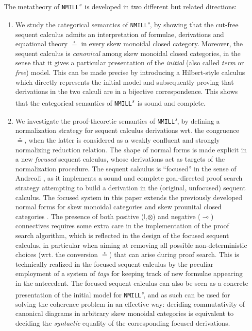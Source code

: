 \documentclass[submission,copyright,creativecommons]{eptcs}
\theoremstyle{definition}
\newcommand{\ot}{\otimes}
\newcommand{\lolli}{\multimap}
\newcommand{\I}{\mathsf{I}}
\newcommand{\NMILL}{\texttt{NMILL}}
\newcommand{\SkNMILL}{\NMILL\textsuperscript{\textit{s}}}
\begin{document}
The metatheory of \SkNMILL\ is developed in two different but related directions:
\begin{enumerate}[($i$)]
  \item We study the categorical semantics of \SkNMILL, by showing that the cut-free sequent calculus admits an interpretation of formulae, derivations and equational theory $\circeq$ in every skew monoidal closed category. Moreover, the sequent calculus is \emph{canonical} among skew monoidal closed categories, in the sense that it gives a particular presentation of the \emph{initial} (also called \emph{term} or \emph{free}) model. This can be made precise by introducing a Hilbert-style calculus which directly represents the initial model and subsequently proving that derivations in the two calculi are in a bijective correspondence.
This shows that the categorical semantics of \SkNMILL\ is sound and
complete.

\item We investigate the proof-theoretic semantics of \SkNMILL, by defining a normalization strategy for sequent calculus derivations wrt. the congruence $\circeq$, when the latter is considered as a weakly confluent and strongly normalizing reduction relation. The shape of normal forms is made explicit in a new \emph{focused} sequent calculus, whose derivations act as targets of the normalization procedure. The sequent calculus is ``focused'' in the sense of Andreoli \cite{andreoli:logic:1992}, as it implements a sound and complete goal-directed proof search strategy attempting to build a derivation in the (original, unfocused) sequent calculus. The focused system in this paper extends the previously
developed normal forms for skew monoidal categories \cite{uustalu:sequent:2021} and skew prounital closed categories \cite{uustalu:deductive:nodate}. The presence of both positive ($\I$,$\ot$) and negative ($\lolli$) connectives requires some extra care in the implementation of the proof search algorithm, which is reflected in the design of the focused sequent calculus, in particular when aiming at removing all possible non-deterministic choices (wrt. the conversion $\circeq$) that can arise during proof search. This is technically realized in the focused sequent calculus by the peculiar employment of a system of \emph{tags} for keeping track of new formulae appearing in the antecedent. The focused sequent calculus can also be seen as a concrete presentation of the initial model for \SkNMILL, and as such can be used for solving the coherence problem in an effective way: deciding commutativity of canonical diagrams in arbitrary skew monoidal categories is equivalent to deciding the \emph{syntactic} equality of the corresponding focused derivations.
\end{enumerate}
\end{document}

